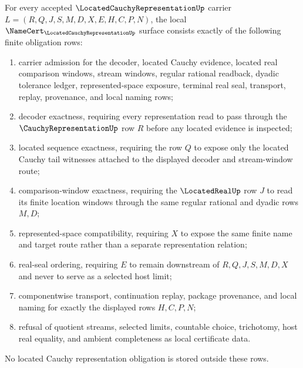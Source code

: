 \begin{theorem}
\label{thm:located-cauchy-representation-namecert-obligations}
For every accepted $\LocatedCauchyRepresentationUp$ carrier $L=(R,Q,J,S,M,D,X,E,H,C,P,N)$, the local $\NameCert_{\LocatedCauchyRepresentationUp}$ surface consists exactly of the following finite obligation rows:
\begin{enumerate}
\item carrier admission for the decoder, located Cauchy evidence, located real comparison windows, stream windows, regular rational readback, dyadic tolerance ledger, represented-space exposure, terminal real seal, transport, replay, provenance, and local naming rows;
\item decoder exactness, requiring every representation read to pass through the $\CauchyRepresentationUp$ row $R$ before any located evidence is inspected;
\item located sequence exactness, requiring the row $Q$ to expose only the located Cauchy tail witnesses attached to the displayed decoder and stream-window route;
\item comparison-window exactness, requiring the $\LocatedRealUp$ row $J$ to read its finite location windows through the same regular rational and dyadic rows $M,D$;
\item represented-space compatibility, requiring $X$ to expose the same finite name and target route rather than a separate representation relation;
\item real-seal ordering, requiring $E$ to remain downstream of $R,Q,J,S,M,D,X$ and never to serve as a selected host limit;
\item componentwise transport, continuation replay, package provenance, and local naming for exactly the displayed rows $H,C,P,N$;
\item refusal of quotient streams, selected limits, countable choice, trichotomy, host real equality, and ambient completeness as local certificate data.
\end{enumerate}
No located Cauchy representation obligation is stored outside these rows.
\end{theorem}
